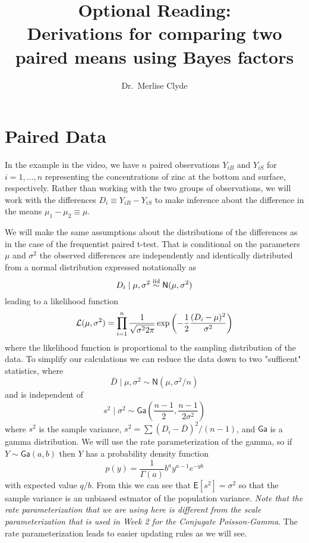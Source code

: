 \documentclass[11pt]{article}
\title{Optional Reading:\\ Derivations for comparing two paired means using Bayes factors}
\author{Dr.~Merlise Clyde}
\date{}
\def\No{\textsf{N}}
\def\Ga{\textsf{Ga}}
\newcommand{\E}{\textsf{E}}
\newcommand{\iid}{\ensuremath{\mathrel{\mathop{\sim}\limits^{\rm iid}}}}
\begin{document}



\maketitle










\section*{Paired Data}
In the example in the video,  we have $n$ paired observations $Y_{iB}$ and $Y_{iS}$  for $i = 1, \ldots, n$ representing the concentrations of zinc at the bottom and surface, respectively. Rather than working with the two groups of observations, we will work with the differences $D_{i} \equiv Y_{iB} - Y_{iS}$ to make inference about the difference in the means $\mu_1 - \mu_2 \equiv \mu$.   

We will make the same assumptions about the distributions of the differences as in the case of the frequentist paired t-test.  That is conditional on the parameters $\mu$ and $\sigma^2$
the observed differences are independently and identically distributed from a  normal distribution expressed notationally as
$$D_i \mid \mu, \sigma^2 \iid \No(\mu, \sigma^2)$$ leading to a likelihood function 
$$
{\cal{L}}(\mu, \sigma^2) = \prod_{i = 1}^{n} \frac{1}{\sqrt{\sigma^2 2 \pi}} \exp{\left( - \frac{1}{2}\frac{(D_i - \mu)^2}{\sigma^2} \right)} 
$$
where the likelihood function is proportional to the sampling distribution of the data.
To simplify our calculations we can reduce the data down to two "sufficent" statistics, where
$$ \bar{D} \mid \mu, \sigma^2 \sim \No(\mu,  \sigma^2/n)$$
and is independent of 
$$ 
s^2 \mid \sigma^2 \sim  \Ga\left(\frac{n - 1}{2},  \frac{n-1}{2 \sigma^2}\right)
$$
where $s^2$ is the sample variance, $s^2 = \sum(D_i - \bar{D})^2/(n-1)$, and $\Ga$ is a gamma distribution.  We will use the rate parameterization of the gamma, so if $Y \sim \Ga(a, b)$ then $Y$ has a probability density function 
$$
p(y) = \frac{1}{\Gamma(a)} b^a y^{a - 1} e^{- y b} 
$$
with expected value $q/b$.  From this we can see that $\E[s^2] = \sigma^2$ so that the sample variance is an unbiased estmator of the population variance. {\it Note that the rate parameterization that we are using here is different from the scale parameterization that is used in Week 2 for the Conjugate Poisson-Gamma}.  The rate parameterization leads to easier updating rules as we will see.   
\end{document}
